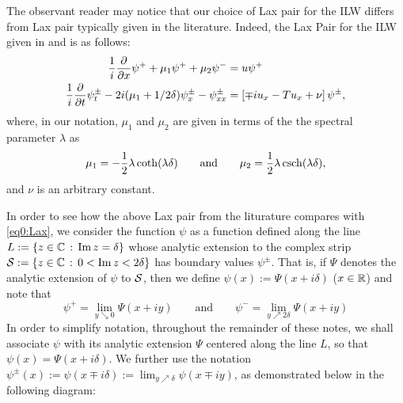 \documentclass[../dissertation.tex]{subfiles}
\begin{document}
The observant reader may notice that our choice of Lax pair for the ILW dif{}fers 
from Lax pair typically given in the literature. Indeed, the Lax Pair for the ILW
given in \cite{SATSUMA1979} and \cite{Kodama1982} is as follows:
\begin{subequations}
	\label{eq:ILW.lax}
	\begin{align}
		\label{eq:ILW.lax.x} 
		\frac{1}{i} \frac{\partial}{\partial x} \psi^+ + \mu_1\psi^+ + \mu_2\psi^- &= u \psi^+  \\
		\label{eq:ILW.lax.t}
		\frac{1}{i} \frac{\partial}{\partial t} \psi_t^\pm - 2i (\mu_1 + 1/2\delta) \psi_x^\pm - \psi_{xx}^\pm 
			&= \left[ \mp i u_x - T u_x + \nu \right]\psi^\pm,
	\end{align}
\end{subequations}
where, in our notation, $\mu_1$ and $\mu_2$ are given in terms of the 
the spectral parameter $\lambda$ as
\begin{align*} \label{LambdaAndMu}
	\mu_1 = - \frac{1}{2} \lambda \coth(\lambda \delta) \qquad \text{and} \qquad
	\mu_2 = \frac{1}{2}\lambda \operatorname{csch}(\lambda \delta),
\end{align*}
and $\nu$ is an arbitrary constant.

In order to see how the above Lax pair from the liturature compares with 
\eqref{eq0:Lax},
we consider the function $\psi$ 
as a function defined along the line $L:= \{z \in \mathbb{C} \,:\, \operatorname{Im} z = \delta\}$ 
whose analytic extension to the complex strip 
$\mathcal S := \{ z \in \mathbb{C} \,:\,  0 < \operatorname{Im} z < 2 \delta\}$
has boundary values $\psi^\pm$. That is, if $\Psi$ denotes the analytic
extension of $\psi$ to $\mathcal S$, then we define $\psi(x) := \Psi(x + i \delta)$
($x \in \mathbb{R}$) and note that 
\[
	\psi^+ = \lim_{y \searrow 0} \Psi(x + i y) 
		\qquad \text{and} \qquad
	\psi^- = \lim_{y \nearrow 2\delta} \Psi(x + i y)
\]
In order to simplify notation, throughout the remainder of these notes, 
we shall associate $\psi$ with its analytic extension $\Psi$ centered
along the line $L$, so that $\psi(x) = \Psi(x + i\delta)$. 
We further use the notation $\psi^{\pm}(x) := \psi(x \mp i \delta) := 
\lim_{y \nearrow \delta} \psi(x \mp i y)$, as demonstrated below in the
following diagram:
\end{document}
